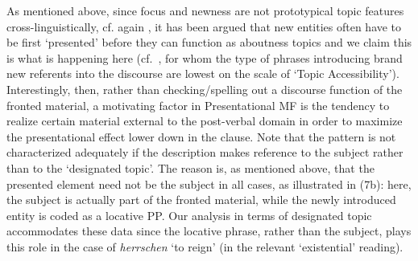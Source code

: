 \begin{exe}
\begin{xlist}[iv.]
\begin{exe}
\begin{xlist}[iv.]
As mentioned above, since focus and newness are not prototypical topic features cross-linguistically, cf. again \cite{Krifka2007a-u}, it has been argued that new entities often have to be first `presented' before they can function as aboutness topics and we claim this is what is happening here (cf.\ \citealp{Lambrecht94a-u}, for whom the type of phrases introducing brand new referents into the discourse are lowest on the scale of `Topic Accessibility'). Interestingly, then, rather than checking/spelling out a discourse function of the fronted material, a motivating factor in Presentational MF is the tendency to realize certain material external to the post-verbal domain in order to maximize the presentational effect lower down in the clause. Note that the pattern is not characterized adequately if the description makes reference to the subject rather than to the `designated topic'. The reason is, as mentioned above, that the presented element need not be the subject in all cases, as illustrated in (7b): here, the subject is actually part of the fronted material, while the newly introduced entity is coded as a locative PP. Our analysis in terms of designated topic accommodates these data since the locative phrase, rather than the subject, plays this role in the case of \emph{herrschen} `to reign' (in the relevant `existential' reading). 

\end{xlist}
\end{exe}
\end{xlist}
\end{exe}
